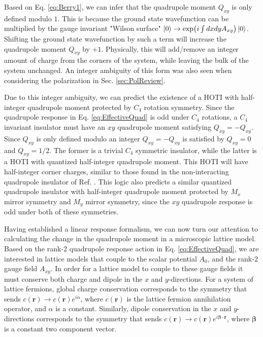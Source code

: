 \documentclass[prb,aps,twocolumn,groupaddress,floatfix]{revtex4-1}
\begin{document}
Based on Eq. \ref{eq:Berry1}, we can infer that the quadrupole moment $Q_{xy}$ is only defined modulo $1$. This is because the ground state wavefunction can be multiplied by the gauge invariant "Wilson surface" $\ket{0} \rightarrow \exp(i \int dx dy A_{xy})\ket{0}$. Shifting the ground state wavefunction by such a term will increase the quadrupole moment $Q_{xy}$ by $+1$. Physically, this will add/remove an integer amount of charge from the corners of the system, while leaving the bulk of the system unchanged. An integer ambiguity of this form was also seen when considering the polarization in Sec. \ref{sec:PolReview}.

Due to this integer ambiguity, we can predict the existence of a HOTI with half-integer quadrupole moment protected by $C_4$ rotation symmetry. Since the quadrupole response in Eq. \ref{eq:EffectiveQuad} is odd under $C_4$ rotations, a $C_4$ invariant insulator must have an $xy$ quadrupole moment satisfying $Q_{xy}=-Q_{xy}$. Since $Q_{xy}$ is only defined modulo an integer $Q_{xy}=-Q_{xy}$ is satisfied by $Q_{xy} = 0$ and $Q_{xy} = 1/2$. The former is a trivial $C_4$ symmetric insulator, while the latter is a HOTI with quantized half-integer quadrupole moment. This HOTI will have half-integer corner charges, similar to those found in the non-interacting quadrupole insulator of Ref. . This logic also predicts a similar quantized quadrupole insulator with half-integer quadrupole moment protected by $M_x$ mirror symmetry and $M_y$ mirror symmetry, since the $xy$ quadrupole response is odd under both of these symmetries. 



Having established a linear response formalism, we can now turn our attention to calculating the change in the quadrupole moment in a microscopic lattice model. Based on the rank-2 quadrupole response action in Eq. \ref{eq:EffectiveQuad}, we are interested in lattice models that couple to the scalar potential $A_0$, and the rank-2 gauge field $A_{xy}$. In order for a lattice model to couple to these gauge fields it must conserve both charge and dipole in the $x$ and $y$-directions. For a system of lattice fermions, global charge conservation corresponds to the symmetry that sends $c(\bm{r}) \rightarrow c(\bm{r})e^{i\alpha}$, where $c(\bm{r})$ is the lattice fermion annihilation operator, and $\alpha$ is a constant. Similarly, dipole conservation in the $x$ and $y$-directions corresponds to the symmetry that sends $c(\bm{r})\rightarrow c(\bm{r}) e^{ i \bm{\beta}\cdot\bm{r}}$, where $\bm{\beta}$ is a constant two component vector.
\end{document}
